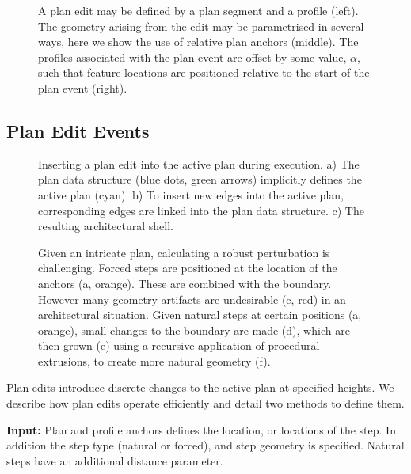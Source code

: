 \begin{figure}
  \centering
  \def\svgwidth{0.9\columnwidth}
  
  \caption[Anchors and plan edits]{\label{fig:pe_anchor_plan_event}A plan edit may be defined by a plan segment and a profile (left). The geometry arising from the edit may be parametrised in several ways, here we show the use of relative plan anchors (middle). The profiles associated with the plan event are offset by some value, $\alpha$, such that feature locations are positioned relative to the start of the plan event (right).}
\end{figure}

\FloatBarrier
\subsection {Plan Edit Events}
\label{s:plan_edits}

\begin{figure}
  \centering
  \def\svgwidth{1.0\columnwidth}
  
  \caption[Plan edits update the corner data structure]{\label{fig:plan_edit} Inserting a plan edit into the active plan during execution. a) The plan data structure (blue dots, green arrows) implicitly defines the active plan (cyan). b) To insert new edges into the active plan, corresponding edges are linked into the plan data structure. c) The resulting architectural shell. }
\end{figure}

\begin{figure}
  \centering
  \def\svgwidth{1.0\columnwidth}
  
  \caption[The advantages of natural steps]{\label{fig:natural_step} Given an intricate plan, calculating a robust perturbation is challenging. Forced steps are positioned at the location of the anchors (a, orange). These are combined with the boundary. However many geometry artifacts are undesirable (c, red) in an architectural situation. Given natural steps at certain positions (a, orange), small changes to the boundary are made (d), which are then grown (e) using a recursive application of procedural extrusions, to create more natural geometry (f).
 }
\end{figure}

Plan edits introduce discrete changes to the active plan at specified heights. We describe how plan edits operate efficiently and detail two methods to define them.

{\bf Input:} Plan and profile anchors defines the location, or locations of the step. In addition the step type (natural or forced), and step geometry is specified. Natural steps have an additional distance parameter.

